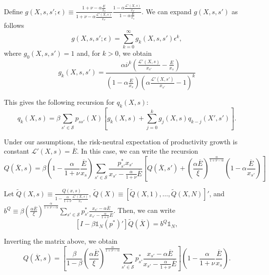 Define $g(X,s,s';\epsilon) \equiv \frac{1+\nu - \alpha \frac{E}{x_s}}{1+\nu - \alpha \frac{\mathcal{L}'(X,s)}{x_{s'}}} \frac{1 - \alpha \frac{\mathcal{L}'(X,s)}{x_{s'}}}{1 - \alpha \frac{E}{x_s}}$. We can expand $g(X,s,s')$ as follows
\begin{equation}
    g(X,s,s';\epsilon) = \sum_{k=0}^\infty g_{k}(X,s,s') \epsilon^k, 
\end{equation}
where  $g_0(X,s,s') =1 $ and, for $k > 0$, we obtain
\begin{equation}
    g_k(X,s,s') =  \frac{\alpha\overline{\nu}^k \left(\frac{\mathcal{L}'(X,s)}{x_{s'}}- \frac{E}{x_s}\right) }{\left(1 - \alpha\frac{E}{x_s}\right) \left( \alpha\frac{\mathcal{L}'(X,s')}{x_{s'}}-1\right)^k } 
\end{equation}

This gives the following recursion for $q_{k}(X,s)$:
\begin{equation}
    q_k(X,s) = \beta \sum_{s'\in \mathcal{S}} p_{s s'}(X)  \left[ g_k(X,s)+ \sum_{j=0}^k g_j(X,s) q_{k-j}(X', s') \right].
\end{equation}

Under our assumptions, the risk-neutral expectation of productivity growth is constant $\mathcal{L}'(X,s) = \overline{E}$.  In this case, we can write the recursion
\begin{equation*}
    Q(\overline{X}, s) = \beta \left( 1 - \frac{\alpha}{1+\nu} \frac{\overline{E} }{x_s}\right) \sum_{s' \in \mathcal{S}} \frac{p^*_{s'} x_{s'}}{x_{s'} - \frac{\alpha}{1+\nu} \overline{E}} \left[ Q(\overline{X}, s')  + \left( \frac{\alpha \overline{E}}{\xi}  \right)^\frac{\alpha}{1+\nu -\alpha} \left( 1 - \alpha  \frac{\overline{E}}{x_{s'}} \right)\right]
\end{equation*}

Let $\tilde{Q}(X,s) \equiv \frac{Q(x,s)}{1 - \frac{\alpha}{1+\nu} \frac{\mathcal{L}'(X,s)}{x_s}}$,
$\tilde{Q}(X) \equiv [\tilde{Q}(X,1), \ldots, \tilde{Q}(X,N)]' $, and $b^Q \equiv \beta \left( \frac{\alpha \overline{E}}{\xi}  \right)^\frac{\alpha}{1+\nu -\alpha} \sum_{s'\in \mathcal{S}} p_{s'}^* \frac{x_{s'} - \alpha \overline{E}}{x_{s'} - \frac{\alpha}{1+\nu}\overline{E} } $.
Then, we can write 
\begin{equation}
    \left[ I - \beta \mathbb{1}_N (p^*)' \right] \tilde{Q}(\overline{X}) = b^Q \mathbb{1}_N,
\end{equation}

Inverting the matrix above, we obtain
\begin{equation}
    Q(\overline{X},s) = \left[\frac{\beta}{1-\beta} \left( \frac{\alpha \overline{E}}{\xi}  \right)^\frac{\alpha}{1+\nu -\alpha}   \sum_{s'\in \mathcal{S}} p_{s'}^* \frac{x_{s'} - \alpha \overline{E}}{x_{s'} - \frac{\alpha}{1+\nu}\overline{E}} \right]\left( 1 - \frac{\alpha}{1+\nu} \frac{\overline{E} }{x_s}\right). 
\end{equation}

